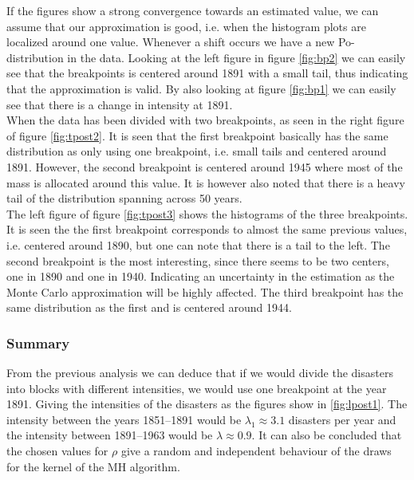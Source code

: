 

If the figures show a strong convergence towards an estimated value, we can assume that our approximation is good, i.e. when the histogram plots are localized around one value. Whenever a shift occurs we have a new Po-distribution in the data. Looking at the left figure in figure \ref{fig:bp2} we can easily see that the breakpoints is centered around 1891 with a small tail, thus indicating that the approximation is valid. By also looking at figure \ref{fig:bp1} we can easily see that there is a change in intensity at 1891. \\

When the data has been divided with two breakpoints, as seen in the right figure of figure \ref{fig:tpost2}. It is seen that the first breakpoint basically has the same distribution as only using one breakpoint, i.e. small tails and centered around 1891. However, the second breakpoint is centered around 1945 where most of the mass is allocated around this value. It is however also noted that there is a heavy tail of the distribution spanning across 50 years. \\

The left figure of figure \ref{fig:tpost3} shows the histograms of the three breakpoints. It is seen the the first breakpoint corresponds to almost the same previous values, i.e. centered around 1890, but one can note that there is a tail to the left. The second breakpoint is the most interesting, since there seems to be two centers, one in 1890 and one in 1940. Indicating an uncertainty in the estimation as the Monte Carlo approximation will be highly affected. The third breakpoint has the same distribution as the first and is centered around 1944. \\

\subsubsection*{Summary}
From the previous analysis we can deduce that if we would divide the disasters into blocks with different intensities, we would use one breakpoint at the year 1891. Giving the intensities of the disasters as the figures show in \ref{fig:lpost1}. The intensity between the years 1851--1891 would be $\lambda_1 \approx 3.1$ disasters per year and the intensity between 1891--1963 would be $\lambda \approx 0.9$. It can also be concluded that the chosen values for $\rho$ give a random and independent behaviour of the draws for the kernel of the MH algorithm. 

